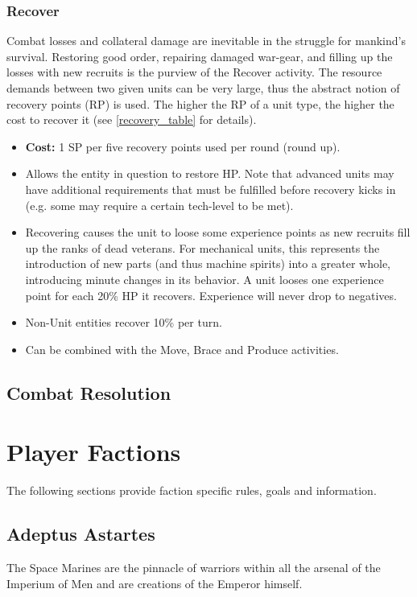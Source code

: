 \subsection{Recover}\label{recover_stance}
Combat losses and collateral damage are inevitable in the struggle for mankind's survival. Restoring good order, repairing damaged war-gear, and filling up the losses with new recruits is the purview of the Recover activity. The resource demands between two given units can be very large, thus the abstract notion of recovery points (RP) is used. The higher the RP of a unit type, the higher the cost to recover it (see \ref{recovery_table} for details).
\begin{itemize}
	\item \textbf{Cost:} 1 SP per five recovery points used per round (round up).
	\item Allows the entity in question to restore HP. Note that advanced units may have additional requirements that must be fulfilled before recovery kicks in (e.g. some may require a certain tech-level to be met).
	\item Recovering causes the unit to loose some experience points as new recruits fill up the ranks of dead veterans. For mechanical units, this represents the introduction of new parts (and thus machine spirits) into a greater whole, introducing minute changes in its behavior. A unit looses one experience point for each 20\% HP it recovers. Experience will never drop to negatives.
	\item Non-Unit entities recover 10\% per turn.
	\item Can be combined with the Move, Brace and Produce activities.
\end{itemize} 

\section{Combat Resolution}


\chapter{Player Factions}
The following sections provide faction specific rules, goals and information.

\section{Adeptus Astartes}
The Space Marines are the pinnacle of warriors within all the arsenal of the Imperium of Men and are creations of the Emperor himself.

